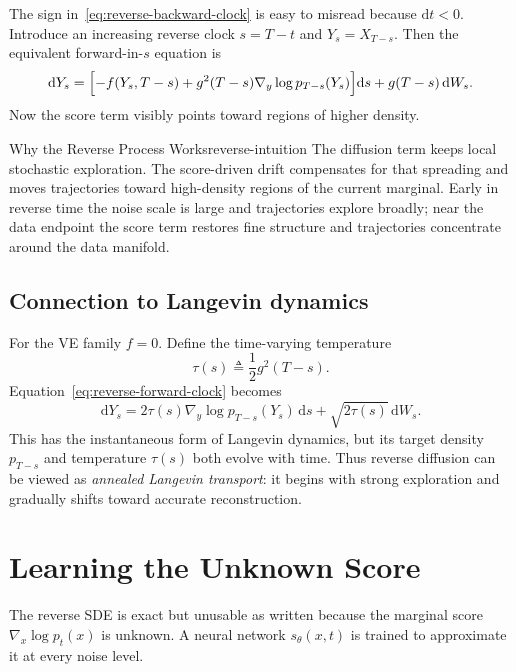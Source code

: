 \documentclass[11pt,a4paper]{article}
\renewcommand{\d}{\mathrm{d}}
\begin{document}
The sign in~\eqref{eq:reverse-backward-clock} is easy to misread because
$\d t<0$.  Introduce an increasing reverse clock $s=T-t$ and
$Y_s=X_{T-s}$.  Then the equivalent forward-in-$s$ equation is
\begin{equation}\label{eq:reverse-forward-clock}
  \d Y_s
  =\Bigl[-f(Y_s,T-s)
          +g^2(T-s)\nabla_y\log p_{T-s}(Y_s)\Bigr]\d s
   +g(T-s)\,\d W_s.
\end{equation}
Now the score term visibly points toward regions of higher density.

\begin{remark}{Why the Reverse Process Works}{reverse-intuition}
The diffusion term keeps local stochastic exploration.  The score-driven
drift compensates for that spreading and moves trajectories toward high-density
regions of the current marginal.  Early in reverse time the noise scale is
large and trajectories explore broadly; near the data endpoint the score term
restores fine structure and trajectories concentrate around the data manifold.
\end{remark}

\subsection{Connection to Langevin dynamics}

For the VE family $f=0$.  Define the time-varying temperature
\[
  \tau(s)\triangleq\frac12g^2(T-s).
\]
Equation~\eqref{eq:reverse-forward-clock} becomes
\begin{equation}\label{eq:annealed-langevin}
  \d Y_s
  =2\tau(s)\nabla_y\log p_{T-s}(Y_s)\,\d s
   +\sqrt{2\tau(s)}\,\d W_s.
\end{equation}
This has the instantaneous form of Langevin dynamics, but its target density
$p_{T-s}$ and temperature $\tau(s)$ both evolve with time.  Thus reverse
diffusion can be viewed as \emph{annealed Langevin transport}: it begins with
strong exploration and gradually shifts toward accurate reconstruction.

\section{Learning the Unknown Score}\label{sec:score}

The reverse SDE is exact but unusable as written because the marginal score
$\nabla_x\log p_t(x)$ is unknown.  A neural network $s_\theta(x,t)$ is trained
to approximate it at every noise level.
\end{document}

